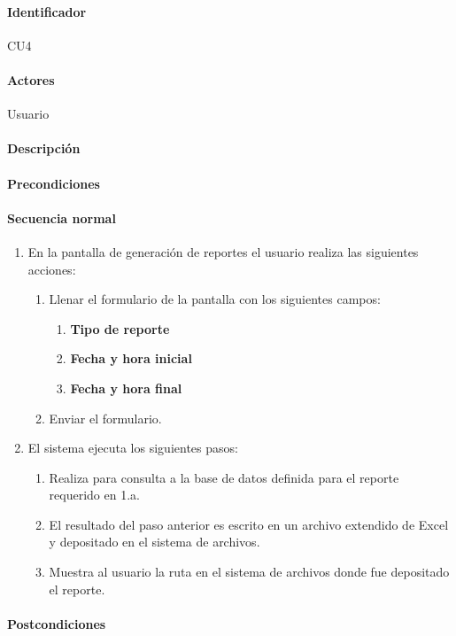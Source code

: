 \paragraph{Identificador}
CU4
\paragraph{Actores}
Usuario
\paragraph{Descripción}
\paragraph{Precondiciones}
\paragraph{Secuencia normal}
\begin{enumerate}
  \item En la pantalla de generación de reportes el usuario realiza las siguientes acciones:
    \begin{enumerate}
    \item Llenar el formulario de la pantalla con los siguientes campos:
    \begin{enumerate}
      \item \textbf{Tipo de reporte}
      \item \textbf{Fecha y hora inicial}
      \item \textbf{Fecha y hora final}
    \end{enumerate}
    \item Enviar el formulario.
  \end{enumerate}
  \item El sistema ejecuta los siguientes pasos:
  \begin{enumerate}
    \item Realiza para consulta a la base de datos definida para el reporte requerido en 1.a.
    \item El resultado del paso anterior es escrito en un archivo extendido de Excel y depositado en el sistema de archivos.
    \item Muestra al usuario la ruta en el sistema de archivos donde fue depositado el reporte.
  \end{enumerate}
\end{enumerate}
\paragraph{Postcondiciones}
